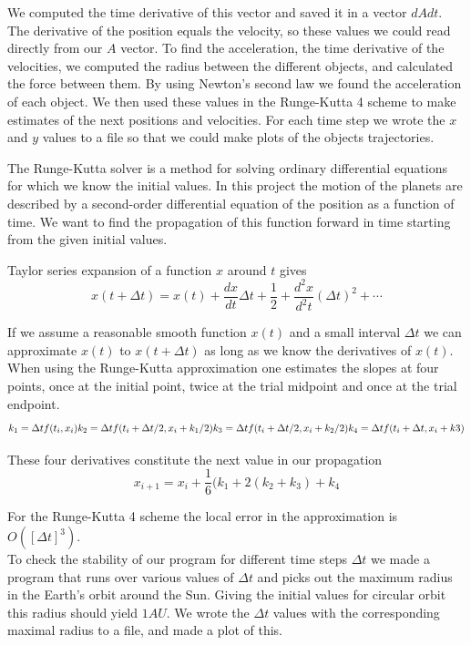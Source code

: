 \documentclass[a4paper,12pt, english]{article}
\begin{document}
We computed the time derivative of this vector and saved it in a vector $dAdt$. The derivative of the position equals the velocity, so these values we could read directly from our $A$ vector. 
To find the acceleration, the time derivative of the velocities, we computed the radius between the different objects, and calculated the force between them. By using Newton's second law we found the acceleration of each object. We then used these values in the Runge-Kutta 4 scheme to make estimates of the next positions and velocities. For each time step we wrote the $x$ and $y$ values to a file so that we could make plots of the objects trajectories.    

The Runge-Kutta solver is a method for solving ordinary differential equations for which we know the initial values. In this project the motion of the planets are described by a second-order differential equation of the position as a function of time. We want to find the propagation of this function forward in time starting from the given initial values. 

Taylor series expansion of a function $x$ around $t$ gives
$$ x(t+ \Delta t) = x(t) + \frac{dx}{dt} \Delta t + \frac{1}{2} + \frac{d^2 x}{d^2 t} (\Delta t)^2 + \cdots $$

If we assume a reasonable smooth function $x(t)$ and a small interval $\Delta t$ we can approximate $x(t)$ to $x(t + \Delta t)$ as long as we know the derivatives of $x(t)$. 
When using the Runge-Kutta approximation one estimates the slopes at four points, once at the initial point, twice at the trial midpoint and once at the trial endpoint. 
$$ k_1 = \Delta t f(t_i,x_i) \\
k_2 = \Delta t f(t_i + \Delta t /2, x_i + k_1/2) \\
k_3 = \Delta t f(t_i + \Delta t/2, x_i + k_2/2) \\
k_4 = \Delta t f(t_i + \Delta t, x_i + k3) $$

These four derivatives constitute the next value in our propagation
$$x_{i+1} = x_i + \frac{1}{6} (k_1 + 2(k_2+k_3) + k_4$$ 

For the Runge-Kutta 4 scheme the local error in the approximation is $O([\Delta t]^3)$. \\

To check the stability of our program for different time steps $\Delta t$ we made a program that runs over various values of $\Delta t$ and picks out the maximum radius in the Earth's orbit around the Sun. Giving the initial values for circular orbit this radius should yield $1 AU$. We wrote the $\Delta t$ values with the corresponding maximal radius to a file, and made a plot of this. \\
\end{document}
